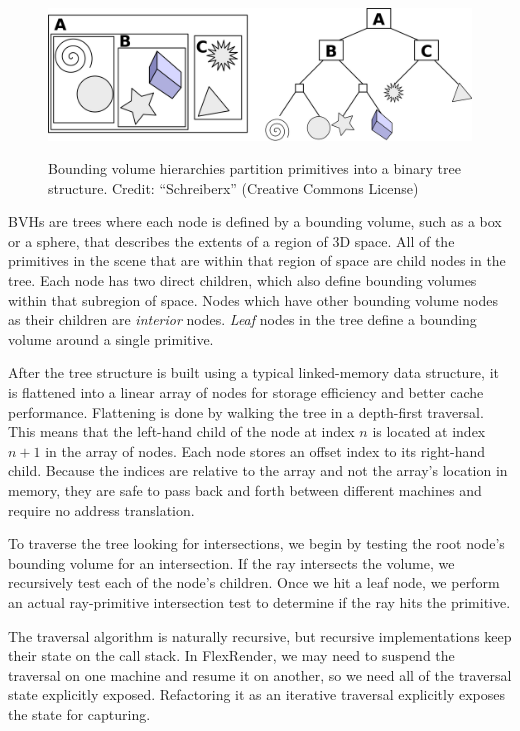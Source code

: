 \documentclass[12pt]{ucthesis}
\newcommand{\captionfonts}{\small\bf\ssp}
\begin{document}
\begin{figure}[h!]
    \centering
    \includegraphics[width=140mm]{figures/bvh.png}
    \captionfonts
    \caption{Bounding volume hierarchies partition primitives into a binary tree structure. Credit: ``Schreiberx'' (Creative Commons License)}
    \label{fig:bvh}
\end{figure}

BVHs are trees where each node is defined by a bounding volume, such as a box
or a sphere, that describes the extents of a region of 3D space. All of the
primitives in the scene that are within that region of space are child nodes
in the tree. Each node has two direct children, which also define bounding
volumes within that subregion of space. Nodes which have other bounding volume
nodes as their children are \emph{interior} nodes. \emph{Leaf} nodes in the tree
define a bounding volume around a single primitive.

After the tree structure is built using a typical linked-memory data structure,
it is flattened into a linear array of nodes for storage efficiency and better
cache performance. Flattening is done by walking the tree in a depth-first
traversal. This means that the left-hand child of the node at index $n$ is
located at index $n + 1$ in the array of nodes. Each node stores an offset
index to its right-hand child. Because the indices are relative to the array
and not the array's location in memory, they are safe to pass back and forth
between different machines and require no address translation.

To traverse the tree looking for intersections, we begin by testing the root
node's bounding volume for an intersection. If the ray intersects the volume,
we recursively test each of the node's children. Once we hit a leaf node,
we perform an actual ray-primitive intersection test to determine if the ray
hits the primitive.

The traversal algorithm is naturally recursive, but recursive implementations
keep their state on the call stack. In FlexRender, we may need to suspend the
traversal on one machine and resume it on another, so we need all of the
traversal state explicitly exposed. Refactoring it as an iterative traversal
explicitly exposes the state for capturing.
\end{document}
